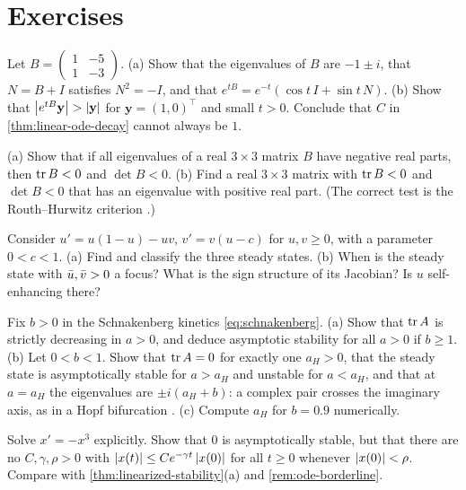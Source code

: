\section{Exercises}\label{sec:ode-exercises}

\begin{exercise}\label{exer:ode-transient}
Let $B=\left(\begin{smallmatrix}1&-5\\1&-3\end{smallmatrix}\right)$. (a) Show that
the eigenvalues of $B$ are $-1\pm i$, that $N=B+I$ satisfies $N^2=-I$, and that
$e^{tB}=e^{-t}(\cos t\,I+\sin t\,N)$. (b) Show that
$\left\lvert e^{tB}\mathbf y\right\rvert>\left\lvert \mathbf y\right\rvert$ for $\mathbf y=(1,0)^\top$ and small
$t>0$. Conclude that $C$ in \cref{thm:linear-ode-decay} cannot always be $1$.
\end{exercise}

\begin{exercise}\label{exer:ode-three}
(a) Show that if all eigenvalues of a real $3\times3$ matrix $B$ have negative
real parts, then $\operatorname{tr} B<0$ and $\det B<0$. (b) Find a real $3\times3$ matrix with
$\operatorname{tr} B<0$ and $\det B<0$ that has an eigenvalue with positive real part. (The correct
test is the Routh--Hurwitz criterion \cite{Murray2002}.)
\end{exercise}

\begin{exercise}\label{exer:ode-predator-prey}
Consider $u'=u(1-u)-uv$, $v'=v(u-c)$ for $u,v\ge0$, with a parameter $0<c<1$.
(a) Find and classify the three steady states. (b) When is the steady state with $\bar u,\bar v>0$ a focus? What is the
sign structure of its Jacobian? Is $u$ self-enhancing there?
\end{exercise}

\begin{exercise}\label{exer:ode-hopf}
Fix $b>0$ in the Schnakenberg kinetics \eqref{eq:schnakenberg}. (a) Show that
$\operatorname{tr} A$ is strictly decreasing in $a>0$, and deduce asymptotic stability for all
$a>0$ if $b\ge1$. (b) Let $0<b<1$. Show that
$\operatorname{tr} A=0$ for exactly one $a_H>0$, that the steady state is asymptotically
stable for $a>a_H$ and unstable for $a<a_H$, and that at $a=a_H$ the eigenvalues
are $\pm i(a_H+b)$: a complex pair crosses the imaginary axis, as in a Hopf
bifurcation \cite{Schnakenberg1979}. (c) Compute $a_H$ for $b=0.9$ numerically.
\end{exercise}

\begin{exercise}\label{exer:ode-cubic}
Solve $x'=-x^3$ explicitly. Show that $0$ is asymptotically stable, but that there
are no $C,\gamma,\rho>0$ with $\left\lvert x(t)\right\rvert\le Ce^{-\gamma t}\left\lvert x(0)\right\rvert$ for all
$t\ge0$ whenever $\left\lvert x(0)\right\rvert<\rho$. Compare with \cref{thm:linearized-stability}(a)
and \cref{rem:ode-borderline}.
\end{exercise}

